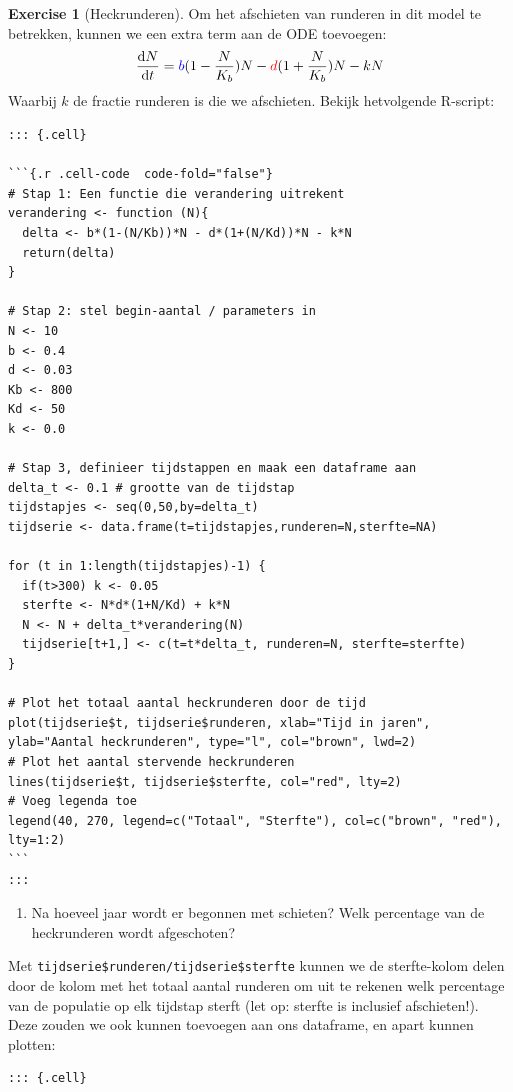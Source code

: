 \documentclass[
  letterpaper,
  DIV=11,
  numbers=noendperiod]{scrartcl}
\providecommand{\tightlist}{%
  \setlength{\itemsep}{0pt}\setlength{\parskip}{0pt}}\usepackage{longtable,booktabs,array}
\theoremstyle{definition}
\newtheorem{exercise}{Exercise}[section]
\theoremstyle{remark}
\begin{document}
\begin{exercise}[Heckrunderen]
Om het afschieten van runderen in dit model te betrekken, kunnen we een
extra term aan de ODE toevoegen: \[
      \frac{\mathrm{d}N}{\mathrm{d}t} = \color{blue}b\color{black}(1-\frac{N}{K_b})N - \color{red}d\color{black}(1+\frac{N}{K_b})N - kN
  \] Waarbij \(k\) de fractie runderen is die we afschieten. Bekijk
hetvolgende R-script:

\begin{verbatim}
::: {.cell}

```{.r .cell-code  code-fold="false"}
# Stap 1: Een functie die verandering uitrekent
verandering <- function (N){
  delta <- b*(1-(N/Kb))*N - d*(1+(N/Kd))*N - k*N
  return(delta)
}

# Stap 2: stel begin-aantal / parameters in
N <- 10
b <- 0.4    
d <- 0.03
Kb <- 800
Kd <- 50
k <- 0.0

# Stap 3, definieer tijdstappen en maak een dataframe aan
delta_t <- 0.1 # grootte van de tijdstap
tijdstapjes <- seq(0,50,by=delta_t)
tijdserie <- data.frame(t=tijdstapjes,runderen=N,sterfte=NA)

for (t in 1:length(tijdstapjes)-1) {
  if(t>300) k <- 0.05
  sterfte <- N*d*(1+N/Kd) + k*N
  N <- N + delta_t*verandering(N)
  tijdserie[t+1,] <- c(t=t*delta_t, runderen=N, sterfte=sterfte)
}

# Plot het totaal aantal heckrunderen door de tijd
plot(tijdserie$t, tijdserie$runderen, xlab="Tijd in jaren", ylab="Aantal heckrunderen", type="l", col="brown", lwd=2)
# Plot het aantal stervende heckrunderen
lines(tijdserie$t, tijdserie$sterfte, col="red", lty=2)
# Voeg legenda toe
legend(40, 270, legend=c("Totaal", "Sterfte"), col=c("brown", "red"), lty=1:2)
```
:::
\end{verbatim}

\begin{enumerate}
\def\labelenumi{\alph{enumi}.}
\setcounter{enumi}{5}
\tightlist
\item
  Na hoeveel jaar wordt er begonnen met schieten? Welk percentage van de
  heckrunderen wordt afgeschoten?
\end{enumerate}

Met \texttt{tijdserie\$runderen/tijdserie\$sterfte} kunnen we de
sterfte-kolom delen door de kolom met het totaal aantal runderen om uit
te rekenen welk percentage van de populatie op elk tijdstap sterft (let
op: sterfte is inclusief afschieten!). Deze zouden we ook kunnen
toevoegen aan ons dataframe, en apart kunnen plotten:

\begin{verbatim}
::: {.cell}


\end{verbatim}
\end{exercise}
\end{document}
